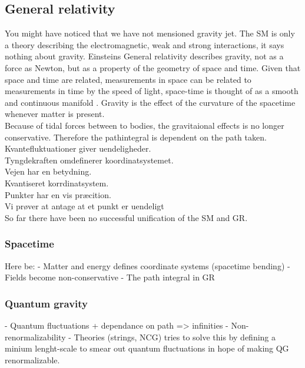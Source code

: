 \subsection{General relativity}
You might have noticed that we have not mensioned gravity jet. The SM is only a theory describing the electromagnetic, weak and strong interactions, it says nothing about gravity. Einsteins General relativity describes gravity, not as a force as Newton, but as a property of the geometry of space and time. Given that space and time are related, measurements in space can be related to measurements in time by the speed of light, space-time is thought of as a smooth and continuous manifold . Gravity is the effect of the curvature of the spacetime whenever matter is present.\\
Because of tidal forces between to bodies, the gravitaional effects is no longer conservative. Therefore the pathintegral is dependent on the path taken.\\
Kvantefluktuationer giver uendeligheder. \\
Tyngdekraften omdefinerer koordinatsystemet.\\ 
Vejen har en betydning. \\
Kvantiseret korrdinatsystem.\\ 
Punkter har en vis præcition. \\
Vi prøver at antage at et punkt er uendeligt \\
So far there have been no successful unification of the SM and GR.

\subsubsection{Spacetime}
Here be:
- Matter and energy defines coordinate systems (spacetime bending)
- Fields become non-conservative
- The path integral in GR

\subsubsection{Quantum gravity}
- Quantum fluctuations + dependance on path => infinities
- Non-renormalizability
- Theories (strings, NCG) tries to solve this by defining a minium lenght-scale
  to smear out quantum fluctuations in hope of making QG renormalizable.